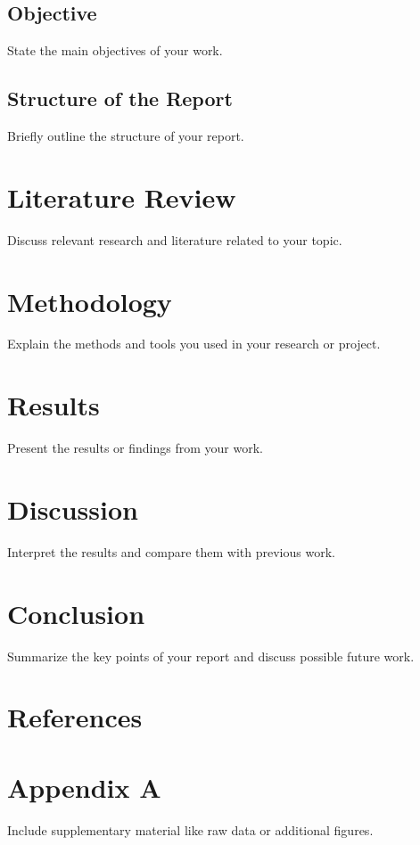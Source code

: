 \documentclass[12pt,a4paper]{report}
\begin{document}
	\section{Objective}
	State the main objectives of your work.
	\section{Structure of the Report}
	Briefly outline the structure of your report.
	
	\chapter{Literature Review}
	Discuss relevant research and literature related to your topic.
	
	\chapter{Methodology}
	Explain the methods and tools you used in your research or project.
	
	\chapter{Results}
	Present the results or findings from your work.
	
	\chapter{Discussion}
	Interpret the results and compare them with previous work.
	
	\chapter{Conclusion}
	Summarize the key points of your report and discuss possible future work.
	
	\chapter*{References}
	
	
	\appendix
	\chapter{Appendix A}
	Include supplementary material like raw data or additional figures.
	
\end{document}
